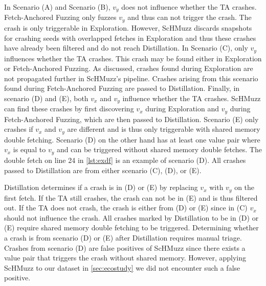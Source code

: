 \documentclass[conference]{IEEEtran}
\newcommand{\sysname}{ScHMuzz\xspace}
\newcommand{\stageone}{Exploration\xspace}
\newcommand{\stagetwo}{Fetch-Anchored Fuzzing\xspace}
\newcommand{\stagethree}{Distillation\xspace}
\begin{document}
In Scenario (A) and Scenario (B), $v_y$ does not influence whether the TA crashes. 
\stagetwo only fuzzes $v_y$ and thus 
can not trigger the crash. The crash is only triggerable in 
\stageone. However, \sysname discards snapshots for crashing seeds with overlapped fetches in \stageone 
and thus these crashes have already been filtered and do not reach \stagethree.
In Scenario (C), only $v_y$ influences whether the TA crashes. This crash may be found 
either in \stageone or \stagetwo. As discussed, crashes found during \stageone are not 
propagated further in \sysname's pipeline. Crashes arising from this scenario found during 
\stagetwo are passed to \stagethree. 
Finally, in scenario (D) and (E), both $v_x$ and $v_y$ influence whether the TA crashes. 
\sysname can find these crashes by first discovering $v_x$ during \stageone and $v_y$ 
during \stagetwo, which are then passed to \stagethree. 
Scenario (E) only crashes if $v_x$ and $v_y$ are different and is thus only triggerable 
with shared memory double fetching. 
Scenario (D) on the other hand 
has at least one value pair where $v_x$ is equal to $v_y$ and can be triggered without 
shared memory double fetches. The double fetch on line 24 in \autoref{lst:exdf} 
is an example of scenario (D).
All crashes passed to \stagethree 
are from either scenario (C), (D), or (E). 


\stagethree determines if a crash is in (D) or (E)
by replacing $v_x$ with $v_y$ on the first fetch. If the TA still 
crashes, the crash can not be in (E) and is thus filtered out. If the TA does not crash, the crash is either from 
(D) or (E) since in (C) $v_x$ should not influence the crash. All crashes marked by 
\stagethree to be in (D) or (E) require shared memory double fetching to be triggered.
Determining whether a crash is from scenario (D) or (E) after \stagethree requires 
manual triage. Crashes from scenario (D) are false positives of \sysname since there 
exists a value pair that triggers the crash without shared memory. 
However, applying \sysname to our dataset in \autoref{sec:ecostudy} we did not encounter such a false positive.
\end{document}
